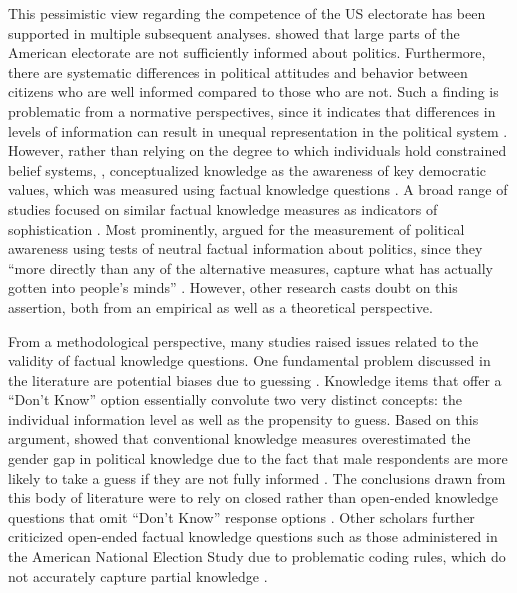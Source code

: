 \documentclass[12pt]{article}
\begin{document}
This pessimistic view regarding the competence of the US electorate has been supported in multiple subsequent analyses. \citet{carpini1996americans} showed that large parts of the American electorate are not sufficiently informed about politics. Furthermore, there are systematic differences in political attitudes and behavior between citizens who are well informed compared to those who are not. Such a finding is problematic from a normative perspectives, since it indicates that differences in levels of information can result in unequal representation in the political system \citep[see also][]{althaus1998information,kuklinski2000misinformation,gilens2001political}. However, rather than relying on the degree to which individuals hold constrained belief systems, \citet{carpini1996americans}, conceptualized knowledge as the awareness of key democratic values, which was measured using factual knowledge questions \citep[see also][]{carpini1993measuring}. A broad range of studies focused on similar factual knowledge measures as indicators of sophistication \citep[e.g.][]{zaller1991information,jacoby1995structure,gomez2001political}. Most prominently, \citet{zaller1992nature} argued for the measurement of political awareness using tests of neutral factual information about politics, since they ``more directly than any of the alternative measures, capture what has actually gotten into people’s minds'' \citep[21]{zaller1992nature}. However, other research casts doubt on this assertion, both from an empirical as well as a theoretical perspective.

From a methodological perspective, many studies raised issues related to the validity of factual knowledge questions. One fundamental problem discussed in the literature are potential biases due to guessing \citep{mondak2000reconsidering,mondak2001developing,mondak2001asked,miller2008experimenting}. Knowledge items that offer a ``Don't Know'' option essentially convolute two very distinct concepts: the individual information level as well as the propensity to guess. Based on this argument, \citet{mondak2004knowledge} showed that conventional knowledge measures overestimated the gender gap in political knowledge due to the fact that male respondents are more likely to take a guess if they are not fully informed \citep[see also][for a more recent discussion of differential item functioning as an explanation for knowledge gaps]{pietryka2013analysis}. The conclusions drawn from this body of literature were to rely on closed rather than open-ended knowledge questions that omit ``Don't Know'' response options \citep[but see][]{sturgis2008experiment,luskin2011don}. Other scholars further criticized open-ended factual knowledge questions such as those administered in the American National Election Study due to problematic coding rules, which do not accurately capture partial knowledge \citep{krosnick2008problems,gibson2009knowing,debell2013harder}.
\end{document}
